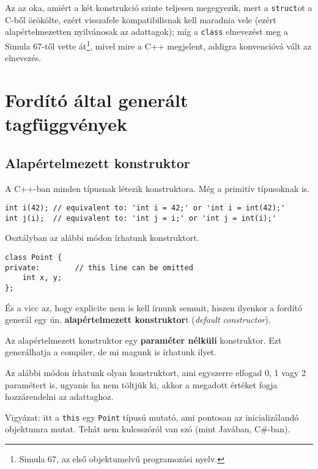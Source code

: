 \documentclass[a4paper, 11pt, oneside]{book}
\begin{document}
Az az oka, amiért a két konstrukció szinte teljesen megegyezik, mert a \verb*|struct|ot a C-ből örökölte, ezért visszafele kompatibilisnak kell maradnia vele (ezért alapértelmezetten nyilvánosak az adattagok); míg a \verb*|class| elnevezést meg a Simula 67-től vette át\footnote{Simula 67, az első objektumelvű programozási nyelv.}, mivel mire a C++ megjelent, addigra konvencióvá vált az elnevezés.

\section{Fordító által generált tagfüggvények}

\subsection{Alapértelmezett konstruktor}

A C++-ban minden típusnak létezik konstruktora. Még a primitív típusoknak is.

\begin{lstlisting}[style=cppstyle]
int i(42); // equivalent to: 'int i = 42;' or 'int i = int(42);'
int j(i);  // equivalent to: 'int j = i;' or 'int j = int(i);'
\end{lstlisting}

Osztályban az alábbi módon írhatunk konstruktort.

\begin{lstlisting}[style=cppstyle]
class Point {
private:		// this line can be omitted
	int x, y;
};
\end{lstlisting}

És a vicc az, hogy explicite nem is kell írnunk semmit, hiszen ilyenkor a fordító generál egy ún. \textbf{alapértelmezett konstruktor}t (\textit{default constructor}).

\begin{tcolorbox}[title={\textbf{Alapértelmezett konstruktor}}]
	Az alapértelmezett konstruktor egy \textbf{paraméter nélküli} konstruktor. Ezt generálhatja a compiler, de mi magunk is írhatunk ilyet.
\end{tcolorbox}

Az alábbi módon írhatunk olyan konstruktort, ami egyszerre elfogad 0, 1 vagy 2 paramétert is, ugyanis ha nem töltjük ki, akkor a megadott értéket fogja hozzárendelni az adattaghoz.

Vigyázat: itt a \verb*|this| egy \verb*|Point| típusú mutató, ami pontosan az inicializálandó objektumra mutat. Tehát nem kulcsszóról van szó (mint Javában, C\#-ban).
\end{document}
